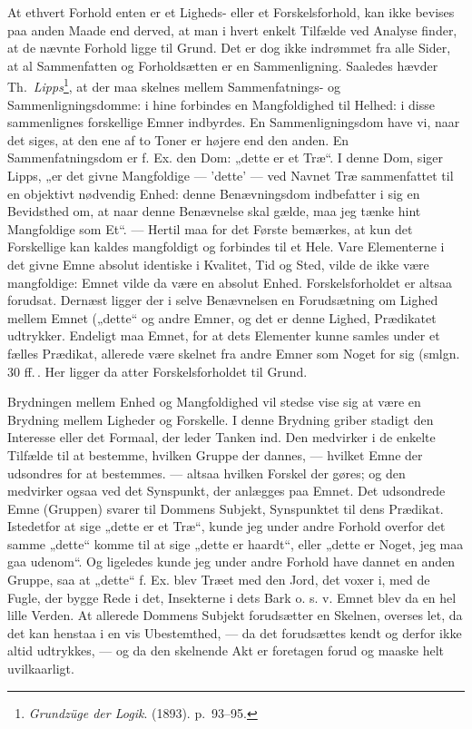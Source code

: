 \documentclass[12pt,a4paper]{book}
\newcommand{\apage}[1]{\marginnote{\footnotesize\textit{[#1]}}}
\begin{document}
At ethvert Forhold enten er et Ligheds- eller et Forskelsforhold, kan ikke
bevises paa anden Maade end derved, at man i hvert enkelt Tilfælde ved
Analyse finder, at de nævnte Forhold ligge til Grund. Det er dog ikke
indrømmet fra alle Sider, at al Sammenfatten og Forholdsætten er en
Sammenligning. Saaledes hævder Th.\ \emph{Lipps}\footnote{\emph{Grundzüge der Logik}. (1893). p.~93--95.}, at der maa skelnes
mellem Sammenfatnings- og Sammenligningsdomme: i hine forbindes en Mangfoldighed til Helhed: i disse sammenlignes forskellige Emner indbyrdes.
En Sammenligningsdom have vi, naar det siges, at den ene af to Toner er
højere end den anden. En Sammenfatningsdom er f. Ex. den Dom:
„dette er et Træ“. I denne Dom, siger Lipps, „er det givne Mangfoldige ---
'dette' --- ved Navnet Træ sammenfattet til en objektivt nødvendig Enhed:
denne Benævningsdom indbefatter i sig en Bevidsthed om, at naar denne
Benævnelse skal gælde, maa jeg tænke hint Mangfoldige som Et“. --- Hertil maa
for det Første bemærkes, at kun det Forskellige kan kaldes mangfoldigt og
forbindes til et Hele. Vare Elementerne i det givne Emne absolut identiske i
Kvalitet, Tid og Sted, vilde de ikke være mangfoldige: Emnet vilde da være en
absolut Enhed. Forskelsforholdet er altsaa forudsat. Dernæst ligger der i
selve Benævnelsen en Forudsætning om Lighed mellem Emnet („dette“ og andre
Emner, og det er denne Lighed, Prædikatet udtrykker. Endeligt maa Emnet, for
at dets Elementer kunne samles under et fælles Prædikat, allerede være skelnet
fra andre Emner som Noget for sig (smlgn. 30 ff.\,. Her ligger da atter
Forskelsforholdet til Grund.

Brydningen mellem Enhed og Mangfoldighed vil stedse vise sig at være en
Brydning mellem Ligheder og Forskelle. I denne Brydning griber stadigt den
Interesse eller det Formaal, der leder Tanken ind. Den medvirker i de enkelte
Tilfælde til at bestemme, hvilken Gruppe der dannes, --- hvilket Emne der
udsondres for at bestemmes. --- altsaa \apage{162} hvilken Forskel der gøres; og den
medvirker ogsaa ved det Synspunkt, der anlægges paa Emnet. Det udsondrede
Emne (Gruppen) svarer til Dommens Subjekt, Synspunktet til dens Prædikat.
Istedetfor at sige „dette er et Træ“, kunde jeg under andre Forhold overfor
det samme „dette“ komme til at sige „dette er haardt“, eller „dette er Noget,
jeg maa gaa udenom“. Og ligeledes kunde jeg under andre Forhold have dannet en
anden Gruppe, saa at „dette“ f. Ex. blev Træet med den Jord, det voxer i, med
de Fugle, der bygge Rede i det, Insekterne i dets Bark o. s. v. Emnet blev da
en hel lille Verden. At allerede Dommens Subjekt forudsætter en Skelnen,
overses let, da det kan henstaa i en vis Ubestemthed, --- da det forudsættes
kendt og derfor ikke altid udtrykkes, --- og da den skelnende Akt er foretagen
forud og maaske helt uvilkaarligt.
\end{document}
